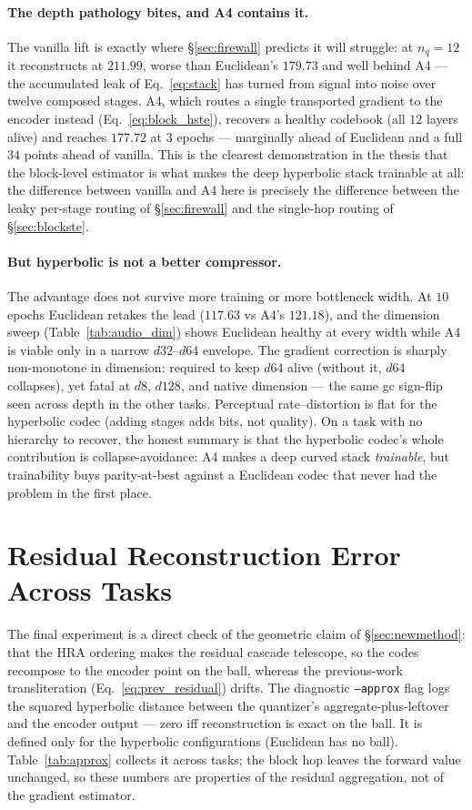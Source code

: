\documentclass[12pt]{report}
\begin{document}
\paragraph{The depth pathology bites, and A4 contains it.} The vanilla lift is exactly where \S\ref{sec:firewall} predicts it will struggle: at $n_q=12$ it reconstructs at $211.99$, worse than Euclidean's $179.73$ and well behind A4 --- the accumulated leak of Eq.~\ref{eq:stack} has turned from signal into noise over twelve composed stages. A4, which routes a single transported gradient to the encoder instead (Eq.~\ref{eq:block_hste}), recovers a healthy codebook (all $12$ layers alive) and reaches $177.72$ at $3$ epochs --- marginally ahead of Euclidean and a full $34$ points ahead of vanilla. This is the clearest demonstration in the thesis that the block-level estimator is what makes the deep hyperbolic stack trainable at all: the difference between vanilla and A4 here is precisely the difference between the leaky per-stage routing of \S\ref{sec:firewall} and the single-hop routing of \S\ref{sec:blockste}.

\paragraph{But hyperbolic is not a better compressor.} The advantage does not survive more training or more bottleneck width. At $10$ epochs Euclidean retakes the lead ($117.63$ vs A4's $121.18$), and the dimension sweep (Table~\ref{tab:audio_dim}) shows Euclidean healthy at every width while A4 is viable only in a narrow $d32$--$d64$ envelope. The gradient correction is sharply non-monotone in dimension: required to keep $d64$ alive (without it, $d64$ collapses), yet fatal at $d8$, $d128$, and native dimension --- the same gc sign-flip seen across depth in the other tasks. Perceptual rate--distortion is flat for the hyperbolic codec (adding stages adds bits, not quality). On a task with no hierarchy to recover, the honest summary is that the hyperbolic codec's whole contribution is collapse-avoidance: A4 makes a deep curved stack \emph{trainable}, but trainability buys parity-at-best against a Euclidean codec that never had the problem in the first place.

\section{Residual Reconstruction Error Across Tasks}
\label{sec:exp_approx}

The final experiment is a direct check of the geometric claim of \S\ref{sec:newmethod}: that the HRA ordering makes the residual cascade telescope, so the codes recompose to the encoder point on the ball, whereas the previous-work transliteration (Eq.~\ref{eq:prev_residual}) drifts. The diagnostic \texttt{--approx} flag logs the squared hyperbolic distance between the quantizer's aggregate-plus-leftover and the encoder output --- zero iff reconstruction is exact on the ball. It is defined only for the hyperbolic configurations (Euclidean has no ball). Table~\ref{tab:approx} collects it across tasks; the block hop leaves the forward value unchanged, so these numbers are properties of the residual aggregation, not of the gradient estimator.
\end{document}
